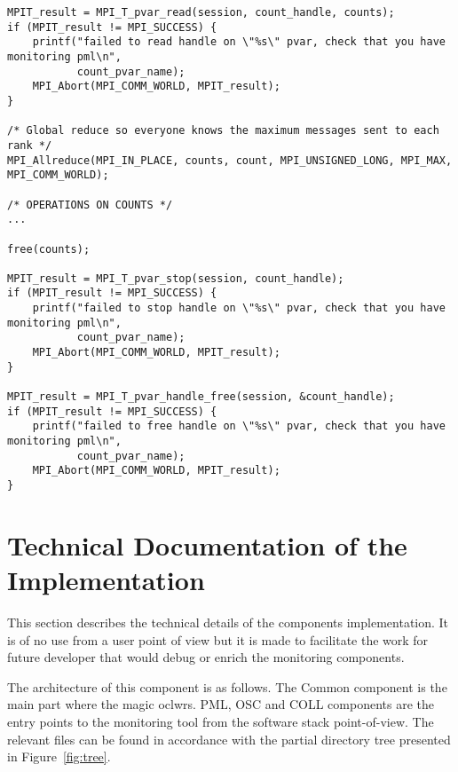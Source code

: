 \begin{verbatim}
MPIT_result = MPI_T_pvar_read(session, count_handle, counts);
if (MPIT_result != MPI_SUCCESS) {
    printf("failed to read handle on \"%s\" pvar, check that you have monitoring pml\n",
           count_pvar_name);
    MPI_Abort(MPI_COMM_WORLD, MPIT_result);
}

/* Global reduce so everyone knows the maximum messages sent to each rank */
MPI_Allreduce(MPI_IN_PLACE, counts, count, MPI_UNSIGNED_LONG, MPI_MAX, MPI_COMM_WORLD);

/* OPERATIONS ON COUNTS */
...

free(counts);

MPIT_result = MPI_T_pvar_stop(session, count_handle);
if (MPIT_result != MPI_SUCCESS) {
    printf("failed to stop handle on \"%s\" pvar, check that you have monitoring pml\n",
           count_pvar_name);
    MPI_Abort(MPI_COMM_WORLD, MPIT_result);
}

MPIT_result = MPI_T_pvar_handle_free(session, &count_handle);
if (MPIT_result != MPI_SUCCESS) {
    printf("failed to free handle on \"%s\" pvar, check that you have monitoring pml\n",
           count_pvar_name);
    MPI_Abort(MPI_COMM_WORLD, MPIT_result);
}
\end{verbatim}

\section{Technical Documentation of the Implementation}
\label{sec:TDI}

This section describes the technical details of the components
implementation. It is of no use from a user point of view but it is made
to facilitate the work for future developer that would debug or enrich
the monitoring components.

The architecture of this component is as follows. The Common component
is the main part where the magic oclwrs. PML, OSC and COLL components
are the entry points to the monitoring tool from the software stack
point-of-view. The relevant files can be found in accordance with
the partial directory tree presented in Figure~\ref{fig:tree}.

